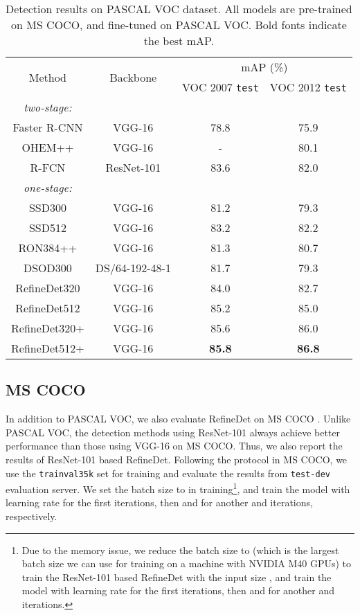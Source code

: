 \documentclass[10pt,twocolumn,letterpaper]{article}
\begin{document}
\begin{table}
\centering
\caption{Detection results on PASCAL VOC dataset. All models are pre-trained on MS COCO, and fine-tuned on PASCAL VOC. Bold fonts indicate the best mAP.}
\vspace{-2mm}
\footnotesize \setlength{\tabcolsep}{1.5pt}
\begin{tabular}{c|c|c|c}
\toprule[1.5pt]
\multirow{2}{*}{Method}   &\multirow{2}{*}{Backbone} &\multicolumn{2}{c}{mAP (\%)} \\
\cline{3-4}
 & & VOC 2007 {\tt test} & VOC 2012 {\tt test}\\
\hline
\textit{two-stage:} & & &\\
Faster R-CNN\cite{DBLP:journals/pami/RenHG017}  &VGG-16 &78.8 &75.9   \\
OHEM++\cite{DBLP:conf/cvpr/ShrivastavaGG16}     &VGG-16 &- &80.1 \\
R-FCN\cite{DBLP:conf/nips/DaiLHS16}             &ResNet-101 &83.6 &82.0\\
\hline
\hline
\textit{one-stage:} & & &\\
SSD300\cite{DBLP:conf/eccv/LiuAESRFB16}         &VGG-16         &81.2 &79.3 \\
SSD512\cite{DBLP:conf/eccv/LiuAESRFB16}         &VGG-16         &83.2 &82.2 \\
RON384++\cite{DBLP:conf/cvpr/KongSYLLC17}       &VGG-16         &81.3 &80.7 \\
DSOD300\cite{DBLP:conf/iccv/abs-1708-01241}     &DS/64-192-48-1 &81.7 &79.3 \\
\hline
RefineDet320   &VGG-16        &84.0      &82.7 \\
RefineDet512   &VGG-16        &85.2      &85.0 \\
RefineDet320+  &VGG-16        &85.6      &86.0 \\
RefineDet512+  &VGG-16        &{\bf 85.8}      &{\bf 86.8}  \\
\bottomrule[1.5pt]
\end{tabular}
\label{tab:coco-to-voc}
\vspace{-2mm}
\end{table}


\subsection{MS COCO}
In addition to PASCAL VOC, we also evaluate RefineDet on MS COCO \cite{DBLP:conf/eccv/LinMBHPRDZ14}. Unlike PASCAL VOC, the detection methods using ResNet-101 always achieve better performance than those using VGG-16 on MS COCO. Thus, we also report the results of ResNet-101 based RefineDet. Following the protocol in MS COCO, we use the {\tt trainval35k} set \cite{DBLP:conf/cvpr/BellZBG16} for training and evaluate the results from {\tt test-dev} evaluation server. We set the batch size to  in training\footnote{Due to the memory issue, we reduce the batch size to  (which is the largest batch size we can use for training on a machine with  NVIDIA M40 GPUs) to train the ResNet-101 based RefineDet with the input size , and train the model with  learning rate for the first  iterations, then  and  for another  and  iterations.}, and train the model with  learning rate for the first  iterations, then  and  for another  and  iterations, respectively.
\end{document}

